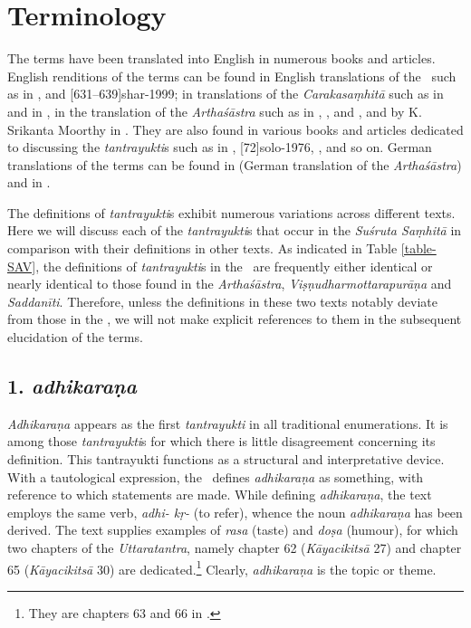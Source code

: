 \section{Terminology}

\label{tantra-trans}
The terms have been translated into English in numerous books and articles. 
English renditions of the terms can be found in English translations of the \SS\ 
such 
as in \cite[171--172]{sing-1980}, and [631--639]{shar-1999}; in 
translations of the \emph{Carakasaṃhitā} such as in \cite[436--444]{shar-2006} 
and in \cite[1050]{gula-1949}, in the translation of the \emph{Arthaśāstra} 
such 
as in \cite[459]{sham-1951}, \cite[593]{kang-1969}, \cite[1103]{unni-2006} 
and 
\cite[]{oliv-2013}, and by K. Srikanta Moorthy in \cite[Appendix 
xi--xxxiv]{muth-1976}. They are also found in various books and articles 
dedicated 
to discussing the \emph{tantrayukti}s such as in \cite[601--602]{ober-1968}, 
\volcite{1}[72]{solo-1976}, \cite[34--155]{lele-1981}, 
\citeyear[36--150]{lele-2006} and so on. German translations of the terms can 
be 
found in \cite[663--664]{meye-1926} (German translation of the 
\emph{Arthaśāstra}) and in \cite{pret-1991}.


The definitions of \emph{tantrayukti}s exhibit numerous variations across 
different texts. Here we will discuss each of the \emph{tantrayukti}s that occur 
in 
the \emph{Suśruta Saṃhitā} in comparison with their definitions in other texts. 
As 
indicated in Table \ref{table-SAV}, the definitions of \emph{tantrayukti}s in the 
\SS\ are frequently either identical or nearly identical to those found in the 
\emph{Arthaśāstra}, \emph{Viṣṇudharmottarapurāṇa} and \emph{Saddanīti}. 
Therefore, unless the definitions in these two texts notably deviate from those in 
the \SS, we will not make explicit references to them in the subsequent 
elucidation 
of the terms. 


\subsection{1. \emph{adhikaraṇa}}

\emph{Adhikaraṇa} appears as the first \emph{tantrayukti} in all traditional 
enumerations. It is among those \emph{tantrayukti}s for which there is little 
disagreement concerning its definition. This tantrayukti functions as a 
structural and interpretative device. With a tautological expression, the \SS\ 
defines \emph{adhikaraṇa} as something, with reference to which statements 
are made. While defining \emph{adhikaraṇa}, the text employs the same verb, 
\emph{adhi- kṛ-} (to refer), whence the noun \emph{adhikaraṇa} has been 
derived. The text supplies examples of \emph{rasa} (taste) and \emph{doṣa} 
(humour), for which two chapters of the \emph{Uttaratantra}, namely chapter 
62 (\emph{Kāyacikitsā} 27) and  chapter 65 (\emph{Kāyacikitsā} 30) are 
dedicated.\footnote{They are chapters 63 and 66 in \Su{A}{B}.} Clearly, 
\emph{adhikaraṇa} is the topic or theme. 

